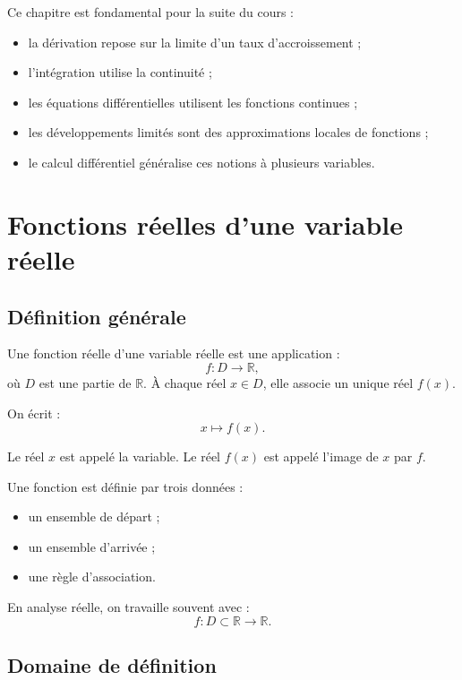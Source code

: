 \documentclass[11pt,a4paper]{article}
\newcommand{\R}{\mathbb R}
\begin{document}
Ce chapitre est fondamental pour la suite du cours :
\begin{itemize}
    \item la dérivation repose sur la limite d'un taux d'accroissement ;
    \item l'intégration utilise la continuité ;
    \item les équations différentielles utilisent les fonctions continues ;
    \item les développements limités sont des approximations locales de fonctions ;
    \item le calcul différentiel généralise ces notions à plusieurs variables.
\end{itemize}

\section{Fonctions réelles d'une variable réelle}

\subsection{Définition générale}

\begin{definitionbox}
Une fonction réelle d'une variable réelle est une application :
\[
f:D\longrightarrow \R,
\]
où \(D\) est une partie de \(\R\).  
À chaque réel \(x\in D\), elle associe un unique réel \(f(x)\).
\end{definitionbox}

On écrit :
\[
x\longmapsto f(x).
\]

Le réel \(x\) est appelé la variable.  
Le réel \(f(x)\) est appelé l'image de \(x\) par \(f\).

\begin{retenirbox}
Une fonction est définie par trois données :
\begin{itemize}
    \item un ensemble de départ ;
    \item un ensemble d'arrivée ;
    \item une règle d'association.
\end{itemize}
En analyse réelle, on travaille souvent avec :
\[
f:D\subset\R\longrightarrow \R.
\]
\end{retenirbox}

\subsection{Domaine de définition}
\end{document}
